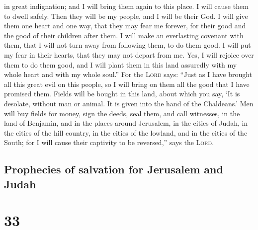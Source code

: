 in great indignation; and I will bring them again to this place. I will
cause them to dwell safely.  Then they will be my people,
and I will be their God.  I will give them one heart and
one way, that they may fear me forever, for their good and the good of
their children after them.  I will make an everlasting
covenant with them, that I will not turn away from following them, to do
them good. I will put my fear in their hearts, that they may not depart
from me.  Yes, I will rejoice over them to do them good,
and I will plant them in this land assuredly with my whole heart and
with my whole soul.''  For the \textsc{Lord} says: ``Just
as I have brought all this great evil on this people, so I will bring on
them all the good that I have promised them.  Fields will
be bought in this land, about which you say, `It is desolate, without
man or animal. It is given into the hand of the Chaldeans.'
 Men will buy fields for money, sign the deeds, seal
them, and call witnesses, in the land of Benjamin, and in the places
around Jerusalem, in the cities of Judah, in the cities of the hill
country, in the cities of the lowland, and in the cities of the South;
for I will cause their captivity to be reversed,'' says the
\textsc{Lord}.

\hypertarget{prophecies-of-salvation-for-jerusalem-and-judah}{%
\subsection{Prophecies of salvation for Jerusalem and
Judah}\label{prophecies-of-salvation-for-jerusalem-and-judah}}

\hypertarget{section-32}{%
\section{33}\label{section-32}}

